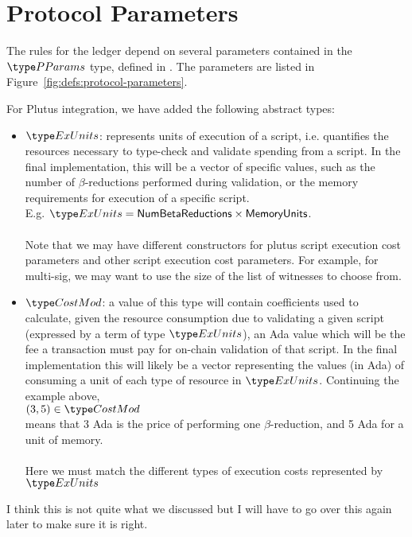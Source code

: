 \section{Protocol Parameters}
\label{sec:protocol-parameters}

The rules for the ledger depend on several parameters contained in the $\PParams$ type,
defined in \cite{byron_ledger_spec}.
The parameters are listed in Figure~\ref{fig:defs:protocol-parameters}.

For Plutus integration, we have added the following abstract types:

\begin{itemize}
\item $\ExUnits$: represents units of execution of
a script, i.e. quantifies the resources necessary to type-check
and validate spending from a script. In the final implementation, this will
be a vector of specific values, such as the number of $\beta$-reductions performed
during validation, or the memory requirements for execution of a specific script. \\
E.g. $\ExUnits = \mathsf{NumBetaReductions} \times \mathsf{MemoryUnits}$. \\~\\
Note that we may have different constructors for plutus script execution cost
parameters and other script execution cost parameters. For example, for
multi-sig, we may want to use the size of the list of witnesses to
choose from.

\item $\CostMod$: a value of this type will contain coefficients used to calculate,
given the resource
consumption due to validating a given script (expressed by a term of type $\ExUnits$),
an Ada value which will be the fee a transaction must pay for on-chain
validation of that script.
In the final implementation this will likely be a vector representing the values
(in Ada) of consuming a unit of each type of resource in $\ExUnits$.
Continuing the example above, \\
$(3,5) \in \CostMod$ \\
means that 3 Ada is the price of performing one $\beta$-reduction, and
5 Ada for a unit of memory. \\~\\
Here we must match the different types of execution costs represented by $\ExUnits$
\end{itemize}

\begin{note}
   I think this is not quite what we discussed but I will have to go over this
   again later to make sure it is right.
\end{note}

